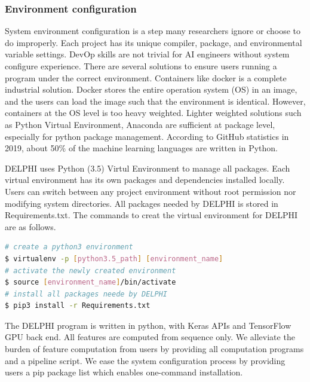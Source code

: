 \subsubsection{Environment configuration}
System environment configuration is a step many researchers ignore or choose to do improperly. Each project has its unique compiler, package, and environmental variable settings. DevOp skills are not trivial for AI engineers without system configure experience. There are several solutions to ensure users running a program under the correct environment. Containers like docker is a complete industrial solution. Docker stores the entire operation system (OS) in an image, and the users can load the image such that the environment is identical. However, containers at the OS level is too heavy weighted. Lighter weighted solutions such as Python Virtual Environment, Anaconda are sufficient at package level, especially for python package management. According to GitHub statistics in 2019, about 50\% of the machine learning languages are written in Python.

DELPHI uses Python (3.5) Virtul Environment to manage all packages. Each virtual environment has its own packages and dependencies installed locally. Users can switch between any project environment without root permission nor modifying system directories. All packages needed by DELPHI is stored in Requirements.txt. The commands to creat the virtual environment for DELPHI are as follows.
\begin{lstlisting}[language=bash,frame=single]
# create a python3 environment
$ virtualenv -p [python3.5_path] [environment_name] 
# activate the newly created environment
$ source [environment_name]/bin/activate 
# install all packages neede by DELPHI
$ pip3 install -r Requirements.txt 
\end{lstlisting}

The DELPHI program is written in python, with Keras \cite{chollet2015keras} APIs and TensorFlow GPU back end. All features are computed from sequence only. We alleviate the burden of feature computation from users by providing all computation programs and a pipeline script. We ease the system configuration process by providing users a pip package list which enables one-command installation. 

